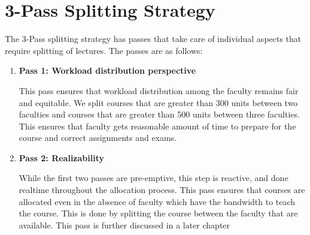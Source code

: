 \section{3-Pass Splitting Strategy}

The 3-Pass splitting strategy has passes that take care of individual aspects that require splitting of lectures. The passes are as follows:

\begin{enumerate}
      \item \textbf{Pass 1: Workload distribution perspective}

            This pass ensures that workload distribution among the faculty remains fair and equitable. We split courses that are greater than 300 units between two faculties and courses that are greater than 500 units between three faculties. This ensures that faculty gets reasonable amount of time to prepare for the course and correct assignments and exams.

      \item \textbf{Pass 2: Realizability}

            While the first two passes are pre-emptive, this step is reactive, and done realtime throughout the allocation process. This pass ensures that courses are allocated even in the absence of faculty which have the bandwidth to teach the course. This is done by splitting the course between the faculty that are available. This pass is further discussed in a later chapter
\end{enumerate}
